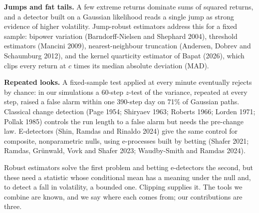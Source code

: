 \documentclass[
]{article}
\begin{document}
\textbf{Jumps and fat tails.} A few extreme returns dominate sums of
squared returns, and a detector built on a Gaussian likelihood reads a
single jump as strong evidence of higher volatility. Jump-robust
estimators address this for a fixed sample: bipower variation
(Barndorff-Nielsen and Shephard 2004), threshold estimators (Mancini
2009), nearest-neighbour truncation (Andersen, Dobrev and Schaumburg
2012), and the kernel quarticity estimator of Bapat (2026), which clips
every return at \(c\) times its median absolute deviation (MAD).

\textbf{Repeated looks.} A fixed-sample test applied at every minute
eventually rejects by chance: in our simulations a 60-step \(z\)-test of
the variance, repeated at every step, raised a false alarm within one
390-step day on 71\% of Gaussian paths. Classical change detection (Page
1954; Shiryaev 1963; Roberts 1966; Lorden 1971; Pollak 1985) controls
the run length to a false alarm but needs the pre-change law.
E-detectors (Shin, Ramdas and Rinaldo 2024) give the same control for
composite, nonparametric nulls, using e-processes built by betting
(Shafer 2021; Ramdas, Grünwald, Vovk and Shafer 2023; Waudby-Smith and
Ramdas 2024).

Robust estimators solve the first problem and betting e-detectors the
second, but these need a statistic whose conditional mean has a meaning
under the null and, to detect a fall in volatility, a bounded one.
Clipping supplies it. The tools we combine are known, and we say where
each comes from; our contributions are three.
\end{document}
